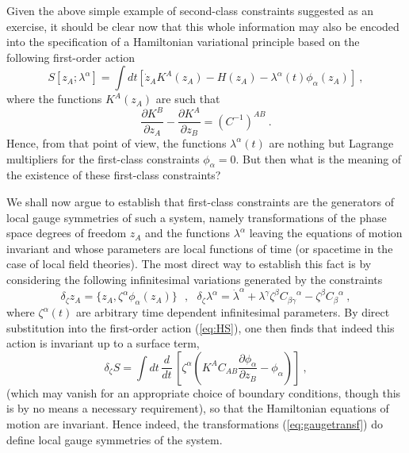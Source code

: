 \documentclass[a4paper,11pt]{article}
\begin{document}
Given the above simple example of second-class constraints suggested as
an exercise, it should
be clear now that this whole information may also be encoded into the
specification of a Hamiltonian variational principle based on the following
first-order action
\begin{equation}
S[z_A;\lambda^\alpha]=\int dt\left[\dot{z}_AK^A(z_A)-H(z_A)-
\lambda^\alpha(t)\phi_\alpha(z_A)\right]\ ,
\label{eq:HS}
\end{equation}
where the functions $K^A(z_A)$ are such that
\begin{equation}
\frac{\partial K^B}{\partial z_A}-\frac{\partial K^A}{\partial z_B}=
\left(C^{-1}\right)^{AB}\ .
\end{equation}
Hence, from that point of view, the functions $\lambda^\alpha(t)$ are nothing
but Lagrange multipliers for the first-class constraints $\phi_\alpha=0$.
But then what is the meaning of the existence of these first-class constraints?

We shall now argue to establish that first-class constraints are the
ge\-ne\-ra\-tors of local gauge symmetries of such a system, namely 
transformations
of the phase space degrees of freedom $z_A$ and the functions $\lambda^\alpha$
leaving the equations of motion invariant and whose parameters are local
functions of time (or spacetime in the case of local field theories).
The most direct way to establish this fact is by considering the following
infinitesimal variations generated by the constraints
\begin{equation}
\delta_\zeta z_A=\{z_A,\zeta^\alpha\phi_\alpha(z_A)\}\ \ \ ,\ \ \ 
\delta_\zeta\lambda^\alpha=\dot{\lambda}^\alpha+
\lambda^\gamma\zeta^\beta{C_{\beta\gamma}}^\alpha-
\zeta^\beta{C_\beta}^\alpha\ ,
\label{eq:gaugetransf}
\end{equation}
where $\zeta^\alpha(t)$ are arbitrary time dependent infinitesimal parameters.
By direct substitution into the first-order action (\ref{eq:HS}), one then
finds that indeed this action is invariant up to a surface term,
\begin{equation}
\delta_\zeta S=\int dt\,\frac{d}{dt}\,\left[
\zeta^\alpha\left(K^AC_{AB}\frac{\partial\phi_\alpha}{\partial z_B}-
\phi_\alpha\right)\right]\ ,
\end{equation}
(which may vanish for an appropriate choice of boundary conditions, though
this is by no means a necessary requirement), so that the Hamiltonian
equations of motion are invariant. Hence indeed, the transformations
(\ref{eq:gaugetransf}) do define local gauge symmetries of the system.
\end{document}
